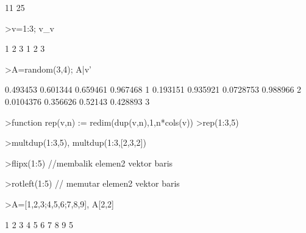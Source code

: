 \documentclass[a4paper,10pt]{article}
\begin{document}
\begin{eulernotebook}
\begin{eulercomment}
\begin{eulercomment}
\begin{euleroutput}
             11 
             25 
\end{euleroutput}
\begin{eulerprompt}
>v=1:3; v_v
\end{eulerprompt}
\begin{euleroutput}
              1             2             3 
              1             2             3 
\end{euleroutput}
\begin{eulerprompt}
>A=random(3,4); A|v'
\end{eulerprompt}
\begin{euleroutput}
       0.493453      0.601344      0.659461      0.967468             1 
       0.193151      0.935921     0.0728753      0.988966             2 
      0.0104376      0.356626       0.52143      0.428893             3 
\end{euleroutput}
\begin{eulerprompt}
>function rep(v,n) := redim(dup(v,n),1,n*cols(v))
>rep(1:3,5)
\end{eulerprompt}
\begin{euleroutput}
  [1,  2,  3,  1,  2,  3,  1,  2,  3,  1,  2,  3,  1,  2,  3]
\end{euleroutput}
\begin{eulerprompt}
>multdup(1:3,5), multdup(1:3,[2,3,2])
\end{eulerprompt}
\begin{euleroutput}
  [1,  1,  1,  1,  1,  2,  2,  2,  2,  2,  3,  3,  3,  3,  3]
  [1,  1,  2,  2,  2,  3,  3]
\end{euleroutput}
\begin{eulerprompt}
>flipx(1:5) //membalik elemen2 vektor baris
\end{eulerprompt}
\begin{euleroutput}
  [5,  4,  3,  2,  1]
\end{euleroutput}
\begin{eulerprompt}
>rotleft(1:5) // memutar elemen2 vektor baris
\end{eulerprompt}
\begin{euleroutput}
  [2,  3,  4,  5,  1]
\end{euleroutput}
\begin{eulerprompt}
>A=[1,2,3;4,5,6;7,8,9], A[2,2]
\end{eulerprompt}
\begin{euleroutput}
              1             2             3 
              4             5             6 
              7             8             9 
  5
\end{euleroutput}

\end{eulercomment}
\end{eulercomment}
\end{eulernotebook}
\end{document}
